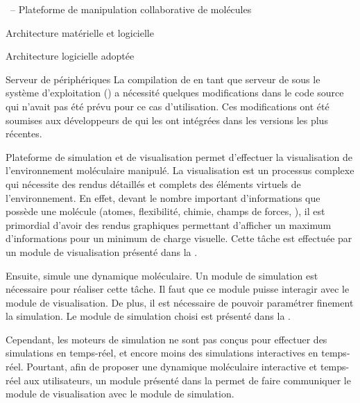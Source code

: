 \documentclass[myfrancais,ngerman,english,french]{mythesis}
\begin{document}
\begin{mychapter}{\myShaddock\ -- Plateforme de manipulation collaborative de molécules}
\begin{mysection}{Architecture matérielle et logicielle}
\begin{mysubsection}{Architecture logicielle adoptée}
\begin{mysubsubsection}{Serveur de périphériques}
					La compilation de  en tant que serveur de \myOmni sous le système d'exploitation \myLinux (\myUbuntu) a nécessité quelques modifications dans le code source qui n'avait pas été prévu pour ce cas d'utilisation.
					Ces modifications ont été soumises aux développeurs de  qui les ont intégrées dans les versions les plus récentes.
				\end{mysubsubsection}
			\end{mysubsection}
		\end{mysection}
		\begin{mysection}{Plateforme de simulation et de visualisation}
			\myShaddock permet d'effectuer la visualisation de l'environnement moléculaire manipulé.
			La visualisation est un processus complexe qui nécessite des rendus détaillés et complets des éléments virtuels de l'environnement.
			En effet, devant le nombre important d'informations que possède une molécule (atomes, flexibilité, chimie, champs de forces, \myetc), il est primordial d'avoir des rendus graphiques permettant d'afficher un maximum d'informations pour un minimum de charge visuelle.
			Cette tâche est effectuée par un module de visualisation présenté dans la .

			Ensuite, \myShaddock simule une dynamique moléculaire.
			Un module de simulation est nécessaire pour réaliser cette tâche.
			Il faut que ce module puisse interagir avec le module de visualisation.
			De plus, il est nécessaire de pouvoir paramétrer finement la simulation.
			Le module de simulation choisi est présenté dans la .

			Cependant, les moteurs de simulation ne sont pas conçus pour effectuer des simulations en temps-réel, et encore moins des simulations interactives en temps-réel.
			Pourtant, afin de proposer une dynamique moléculaire interactive et temps-réel aux utilisateurs, un module présenté dans la  permet de faire communiquer le module de visualisation avec le module de simulation.


\end{mysection}
\end{mychapter}
\end{document}

